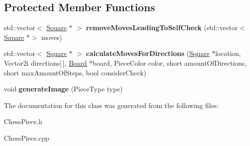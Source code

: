 \subsection*{Protected Member Functions}
\begin{DoxyCompactItemize}
\item 
\mbox{\label{class_chess_piece_a3918de640f232f48572dc16ccc7b46ad}} 
std\+::vector$<$ \mbox{\hyperlink{class_square}{Square}} $\ast$ $>$ {\bfseries remove\+Moves\+Leading\+To\+Self\+Check} (std\+::vector$<$ \mbox{\hyperlink{class_square}{Square}} $\ast$$>$ moves)
\item 
\mbox{\label{class_chess_piece_a474443b35ab57036945c9d72ffba5676}} 
std\+::vector$<$ \mbox{\hyperlink{class_square}{Square}} $\ast$ $>$ {\bfseries calculate\+Moves\+For\+Directions} (\mbox{\hyperlink{class_square}{Square}} $\ast$location, Vector2i directions\mbox{[}$\,$\mbox{]}, \mbox{\hyperlink{class_board}{Board}} $\ast$board, Piece\+Color color, short amount\+Of\+Directions, short max\+Amount\+Of\+Steps, bool consider\+Check)
\item 
\mbox{\label{class_chess_piece_a516757b5d6cc1a37a44d4cc859cdb2b8}} 
void {\bfseries generate\+Image} (Piece\+Type type)
\end{DoxyCompactItemize}


The documentation for this class was generated from the following files\+:\begin{DoxyCompactItemize}
\item 
Chess\+Piece.\+h\item 
Chess\+Piece.\+cpp\end{DoxyCompactItemize}
